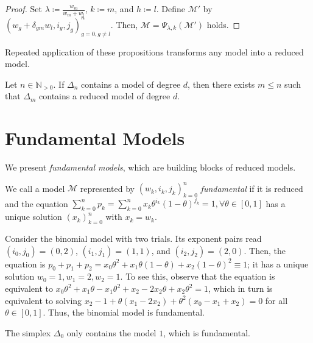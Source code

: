 \begin{proof}
    Set \( \lambda \coloneqq \frac{w_m}{w_m + w_l} \), \( k \coloneqq m \), and \( h \coloneqq l \). Define \( \mathcal{M}' \) by \(  \left( w_g + \delta_{gm}w_l, i_g, j_g  \right)^n_{g=0, g \neq l} \).
    Then, \( \mathcal{M} = \Psi_{\lambda,k}(\mathcal{M}') \) holds.
\end{proof}

Repeated application of these propositions transforms any model into a reduced model.

\begin{corollary}\label{cor:reduced-models}
    Let \( n \in \mathbb{N}_{> 0} \).
    If \( \Delta_n \) contains a model of degree \( d \), then there exists \( m \leq n \) such that \( \Delta_m \) contains a reduced model of degree \( d \).
\end{corollary}


\section{Fundamental Models}

We present \emph{fundamental models}, which are building blocks of reduced models.

\begin{definition}\label{def:fundamental-model}
    We call a model \( \mathcal{M} \) represented by \( (w_k, i_k, j_k)_{k=0}^n \) \emph{fundamental} if it is reduced and the equation \( \sum_{k=0}^n p_k  = \sum_{k=0}^n x_k \theta^{i_k} (1-\theta)^{j_k} = 1, \forall \theta \in [0,1] \) has a unique solution \( (x_k)_{k=0}^n \) with \( x_k = w_k \).
\end{definition}

\begin{example}
    Consider the binomial model with two trials. Its exponent pairs read \( (i_0, j_0) = (0,2) \), \( (i_1, j_1) = (1,1) \), and \( (i_2, j_2) = (2,0) \). Then, the equation is \( p_0 + p_1 + p_2 = x_0\theta^2 + x_1\theta(1-\theta) + x_2(1-\theta)^2 \equiv 1 \); it has a unique solution \( w_0 = 1, w_1 = 2, w_2 = 1 \). To see this, observe that the equation is equivalent to \( x_0\theta^2 + x_1\theta - x_1 \theta^2 + x_2 -2x_2\theta + x_2\theta^2 = 1\), which in turn is equivalent to solving \( x_2 - 1 + \theta(x_1 - 2x_2) + \theta^2(x_0 - x_1 + x_2) = 0 \) for all \( \theta \in [0,1] \). Thus, the binomial model is fundamental.
\end{example}

\begin{example}\label{ex:prob-simplex-0}
    The simplex \( \Delta_0 \) only contains the model \( 1 \), which is fundamental.
\end{example}

